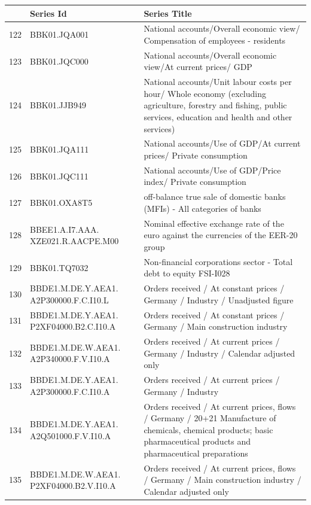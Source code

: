 \documentclass[12pt]{article}
\begin{document}
\begin{table}
\centering
\begin{tabular}{rp{5cm}p{11cm}}
& \textbf{Series Id} & \textbf{Series Title} \\
  \hline
  \hline
  122 & BBK01.JQA001 & National accounts/Overall economic view/ Compensation of employees - residents \\ 
  \hline
  123 & BBK01.JQC000 & National accounts/Overall economic view/At current prices/ GDP \\ 
  \hline
  124 & BBK01.JJB949 & National accounts/Unit labour costs per hour/ Whole economy (excluding agriculture, forestry and fishing, public services, education and health and other services) \\ 
  \hline
  125 & BBK01.JQA111 & National accounts/Use of GDP/At current prices/ Private consumption \\ 
  \hline
  126 & BBK01.JQC111 & National accounts/Use of GDP/Price index/ Private consumption \\ 
  \hline
  127 & BBK01.OXA8T5 & off-balance true sale of domestic banks (MFIs) - All categories of banks \\ 
  \hline
  128 & BBEE1.A.I7.AAA. XZE021.R.AACPE.M00 & Nominal effective exchange rate of the euro against the currencies of the EER-20 group \\ 
  \hline
  129 & BBK01.TQ7032 & Non-financial corporations sector - Total debt to equity FSI-I028 \\ 
  \hline
  130 & BBDE1.M.DE.Y.AEA1. A2P300000.F.C.I10.L & Orders received / At constant prices / Germany / Industry / Unadjusted figure \\ 
  \hline
  131 & BBDE1.M.DE.Y.AEA1. P2XF04000.B2.C.I10.A & Orders received / At constant prices / Germany / Main construction industry \\ 
  \hline
  132 & BBDE1.M.DE.W.AEA1. A2P340000.F.V.I10.A & Orders received / At current prices / Germany / Industry / Calendar adjusted only \\ 
  \hline
  133 & BBDE1.M.DE.Y.AEA1. A2P300000.F.C.I10.A & Orders received / At current prices / Germany / Industry \\ 
  \hline
  134 & BBDE1.M.DE.Y.AEA1. A2Q501000.F.V.I10.A & Orders received / At current prices, flows / Germany / 20+21 Manufacture of chemicals, chemical products; basic pharmaceutical products and pharmaceutical preparations \\ 
  \hline
  135 & BBDE1.M.DE.W.AEA1. P2XF04000.B2.V.I10.A & Orders received / At current prices, flows / Germany / Main construction industry / Calendar adjusted only \\ 

\end{tabular}
\end{table}
\end{document}
